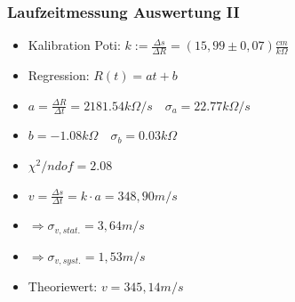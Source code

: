 \documentclass[12pt]{beamer}
\begin{document}
	\begin{frame}
		\frametitle{Laufzeitmessung \qquad Auswertung II}
		\begin{itemize}
			\item Kalibration Poti: $k:=\frac{\Delta s}{\Delta R} =  (15,99 \pm 0,07) \frac{cm}{k\Omega}$\\ [0.5cm]
			
			
			\item Regression: $R(t)=a t+b$
			\item $a = \frac{\Delta R}{\Delta t} = 2181.54 k\Omega/s \quad \sigma_a=22.77 k\Omega/s$
			\item $b=-1.08 k\Omega \quad \sigma_b=0.03 k\Omega$
			\item $\chi^2/ndof=2.08$
			\item $v=\frac{\Delta s}{\Delta t} = k\cdot a = 348,90 m/s$
			\item $\Rightarrow \sigma_{v,stat.}=3,64m/s$
			\item $\Rightarrow \sigma_{v,syst.}=1,53m/s$ \\ [0.4cm]
			\item Theoriewert: $v = 345,14 m/s$
			
		\end{itemize}
		
	\end{frame}
	
	
	
	
	
	
	
	
	
\end{document}
